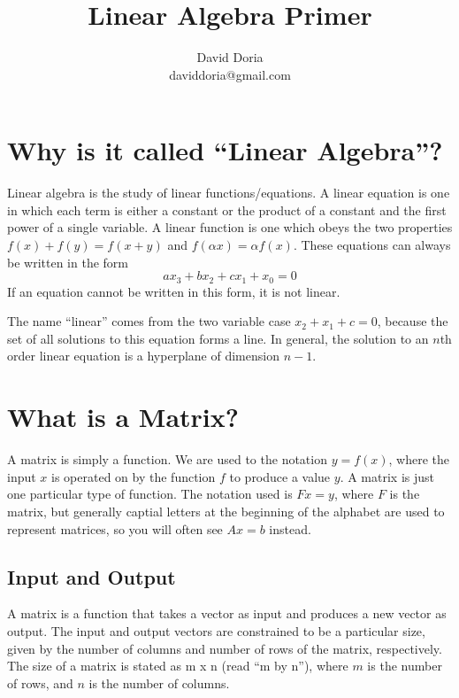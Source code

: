 \documentclass[12pt]{article}
\begin{document}
\title{Linear Algebra Primer}
\author{David Doria\\daviddoria@gmail.com}
\maketitle

\tableofcontents
\newpage

\section{Why is it called ``Linear Algebra''?}
Linear algebra is the study of linear functions/equations. A linear equation is one in which each term is either a constant or the product of a constant and the first power of a single variable. A linear function is one which obeys the two properties $f(x) + f(y) = f(x+y)$ and $f(\alpha x) = \alpha f(x)$.
These equations can always be written in the form
\begin{equation*}
a x_3 + b x_2 + c x_1 + x_0 = 0
\end{equation*}
If an equation cannot be written in this form, it is not linear.

The name ``linear'' comes from the two variable case $x_2 + x_1 + c = 0$, because the set of all solutions to this equation forms a line.  In general, the solution to an $n$th order linear equation is a hyperplane of dimension $n-1$.

\section{What is a Matrix?}
A matrix is simply a function.  We are used to the notation $y = f(x)$, where the input $x$ is operated on by the function $f$ to produce a value $y$.  A matrix is just one particular type of function.  The notation used is $Fx = y$, where $F$ is the matrix, but generally captial letters at the beginning of the alphabet are used to represent matrices, so you will often see $Ax = b$ instead.

\subsection{Input and Output}
A matrix is a function that takes a vector as input and produces a new vector as output.  The input and output vectors are constrained to be a particular size, given by the number of columns and number of rows of the matrix, respectively. The size of a matrix is stated as m x n (read ``m by n''), where $m$ is the number of rows, and $n$ is the number of columns.
\end{document}
